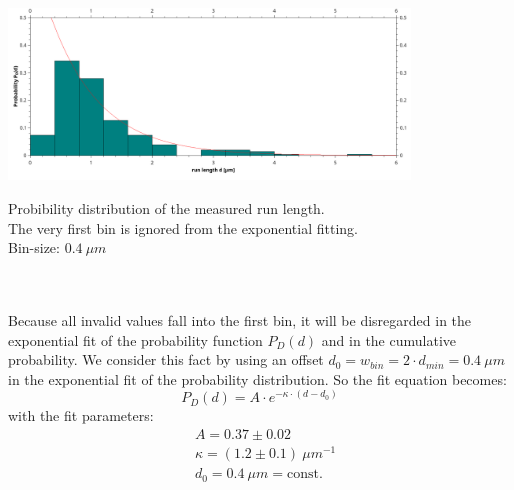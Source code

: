     	 	\centering
    	 	\captionsetup{justification=centering,margin=2cm}
    	 		\includegraphics[width = 0.8\textwidth, keepaspectratio]{pic/histo_runlength_rel.png}
    	 	\caption{Probibility distribution of the measured run length.\\ The very first bin is ignored from the exponential fitting.\\ Bin-size: $0.4\ \unit{\mu m}$}
    	 	\label{exp:histRunLength}
    	 \minipend\\
    	 \ \\   
    	 Because all invalid values fall into the first bin, it will be disregarded in the exponential fit of the probability function $P_D(d)$ and in the cumulative probability. We consider this fact by using an offset $d_0 = w_{bin} = 2 \cdot d_{min} = 0.4\ \unit{\mu m}$ in the exponential fit of the probability distribution. So the fit equation becomes:
    	 \begin{equation*}
    	 	P_D(d) = A \cdot e^{-\kappa\cdot(d-d_0)}
    	 \end{equation*}
    	 with the fit parameters:
    	 \begin{align*}
    	  	&A = 0.37 \pm 0.02\\
    	  	&\kappa = (1.2 \pm 0.1)\ \unit{\mu m^{-1}}\\
    	  	&d_0 = 0.4\ \unit{\mu m}= \mathrm{const.}
    	 \end{align*}
    	 
